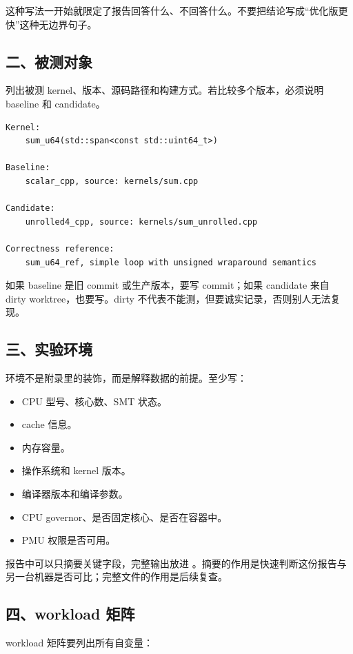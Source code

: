 这种写法一开始就限定了报告回答什么、不回答什么。不要把结论写成“优化版更快”这种无边界句子。

\subsection{二、被测对象}

列出被测 kernel、版本、源码路径和构建方式。若比较多个版本，必须说明 baseline 和 candidate。

\begin{lstlisting}
Kernel:
    sum_u64(std::span<const std::uint64_t>)

Baseline:
    scalar_cpp, source: kernels/sum.cpp

Candidate:
    unrolled4_cpp, source: kernels/sum_unrolled.cpp

Correctness reference:
    sum_u64_ref, simple loop with unsigned wraparound semantics
\end{lstlisting}

如果 baseline 是旧 commit 或生产版本，要写 commit；如果 candidate 来自 dirty worktree，也要写。dirty 不代表不能测，但要诚实记录，否则别人无法复现。

\subsection{三、实验环境}

环境不是附录里的装饰，而是解释数据的前提。至少写：

\begin{itemize}
  \item CPU 型号、核心数、SMT 状态。
  \item cache 信息。
  \item 内存容量。
  \item 操作系统和 kernel 版本。
  \item 编译器版本和编译参数。
  \item CPU governor、是否固定核心、是否在容器中。
  \item PMU 权限是否可用。
\end{itemize}

报告中可以只摘要关键字段，完整输出放进 。摘要的作用是快速判断这份报告与另一台机器是否可比；完整文件的作用是后续复查。

\subsection{四、workload 矩阵}

workload 矩阵要列出所有自变量：

